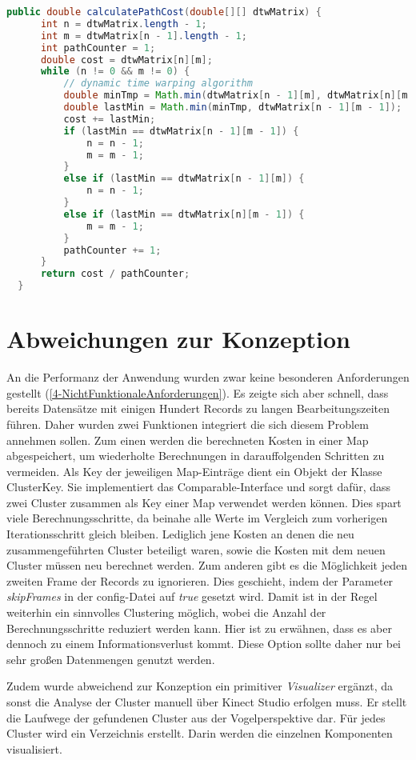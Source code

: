 \begin{lstlisting}[language=Java, caption=DTW: Warping Path berechnen.]
  public double calculatePathCost(double[][] dtwMatrix) {
      int n = dtwMatrix.length - 1;
      int m = dtwMatrix[n - 1].length - 1;
      int pathCounter = 1;
      double cost = dtwMatrix[n][m];
      while (n != 0 && m != 0) {
          // dynamic time warping algorithm
          double minTmp = Math.min(dtwMatrix[n - 1][m], dtwMatrix[n][m - 1]);
          double lastMin = Math.min(minTmp, dtwMatrix[n - 1][m - 1]);
          cost += lastMin;
          if (lastMin == dtwMatrix[n - 1][m - 1]) {
              n = n - 1;
              m = m - 1;
          }
          else if (lastMin == dtwMatrix[n - 1][m]) {
              n = n - 1;
          }
          else if (lastMin == dtwMatrix[n][m - 1]) {
              m = m - 1;
          }
          pathCounter += 1;
      }
      return cost / pathCounter;
  }
\end{lstlisting}

\section{Abweichungen zur Konzeption}
\label{5-AbweichungenKonzeption}
An die Performanz der Anwendung wurden zwar keine besonderen Anforderungen gestellt
(\autoref{4-NichtFunktionaleAnforderungen}).
Es zeigte sich aber schnell, dass bereits Datensätze mit einigen Hundert Records zu langen Bearbeitungszeiten führen.
Daher wurden zwei Funktionen integriert die sich diesem Problem annehmen sollen.
Zum einen werden die berechneten Kosten in einer Map abgespeichert,
um wiederholte Berechnungen in darauffolgenden Schritten zu vermeiden.
Als Key der jeweiligen Map-Einträge dient ein Objekt der Klasse ClusterKey.
Sie implementiert das Comparable-Interface und sorgt dafür,
dass zwei Cluster zusammen als Key einer Map verwendet werden können.
Dies spart viele Berechnungsschritte,
da beinahe alle Werte im Vergleich zum vorherigen Iterationsschritt gleich bleiben.
Lediglich jene Kosten an denen die neu zusammengeführten Cluster beteiligt waren,
sowie die Kosten mit dem neuen Cluster müssen neu berechnet werden.
Zum anderen gibt es die Möglichkeit jeden zweiten Frame der Records zu ignorieren.
Dies geschieht, indem der Parameter \emph{skipFrames} in der config-Datei auf \emph{true} gesetzt wird.
Damit ist in der Regel weiterhin ein sinnvolles Clustering möglich,
wobei die Anzahl der Berechnungsschritte reduziert werden kann.
Hier ist zu erwähnen, dass es aber dennoch zu einem Informationsverlust kommt.
Diese Option sollte daher nur bei sehr großen Datenmengen genutzt werden.

Zudem wurde abweichend zur Konzeption ein primitiver \emph{Visualizer} ergänzt,
da sonst die Analyse der Cluster manuell über Kinect Studio erfolgen muss.
Er stellt die Laufwege der gefundenen Cluster aus der Vogelperspektive dar.
Für jedes Cluster wird ein Verzeichnis erstellt.
Darin werden die einzelnen Komponenten visualisiert.